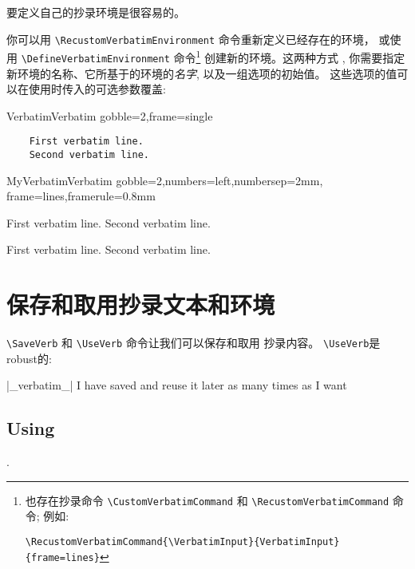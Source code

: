 \documentclass[twoside]{article}
\newif\ifChangeBar \ChangeBarfalse
\newcommand\cs[1]{\texttt{\textbackslash#1}}
\newcommand\verbatimTxt{抄录}
\begin{document}
\ifChangeBar\begin{changebar}\fi
\VerbatimFootnotes
要定义自己的{\verbatimTxt}环境是很容易的。 
  
你可以用 \cs{RecustomVerbatimEnvironment} 命令重新定义已经存在的环境，
或使用 \cs{DefineVerbatimEnvironment} 命令\footnote{%
  \ifChangeBar\begin{changebar}\fi
    也存在{\verbatimTxt}命令 \cs{CustomVerbatimCommand} 和
  \cs{RecustomVerbatimCommand} 命令; 例如:
  
  \noindent
  \verb+\RecustomVerbatimCommand{\VerbatimInput}{VerbatimInput}{frame=lines}+
  \ifChangeBar\end{changebar}\fi} 创建新的环境。这两种方式
, 你需要指定新环境的名称、它所基于的环境的{\em 名字},  
以及一组选项的初始值。 
这些选项的值可以在使用时传入的可选参数覆盖:



\begin{SideBySideExample}
  \RecustomVerbatimEnvironment
    {Verbatim}{Verbatim}
    {gobble=2,frame=single}
  \begin{Verbatim}
    First verbatim line.
    Second verbatim line.
  \end{Verbatim}
\end{SideBySideExample}
\ifChangeBar\end{changebar}\fi

\begin{SideBySideExample}
  \DefineVerbatimEnvironment%
    {MyVerbatim}{Verbatim}
    {gobble=2,numbers=left,numbersep=2mm,
     frame=lines,framerule=0.8mm}
  \begin{MyVerbatim}
    First verbatim line.
    Second verbatim line.
  \end{MyVerbatim}

  \begin{MyVerbatim}[numbers=none,
                     framerule=1pt]
    First verbatim line.
    Second verbatim line.
  \end{MyVerbatim}
\end{SideBySideExample}

\section{保存和取用{\verbatimTxt}文本和环境}

\cs{SaveVerb} 和 \cs{UseVerb} 命令让我们可以保存和取用
{\verbatimTxt}内容。 \cs{UseVerb}是robust的:

%  \DefineShortVerb{\|}
%  \SaveVerb{Verb}|_verbatim_|
\begin{SideBySideExample}
  \DefineShortVerb{\|}
  |_verbatim_|
  I have saved  and reuse 
  it later as many times as I want
  \subsection*{Using }
  .
\end{SideBySideExample}
\end{document}
